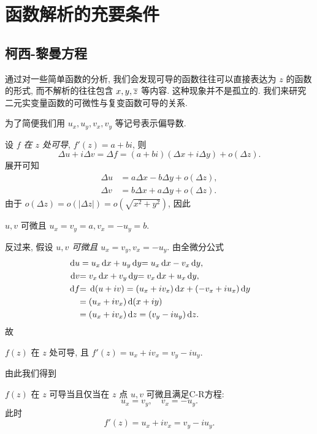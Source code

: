 \documentclass[nocolor,theme=doremi,lang=cn,11pt,chinese,twoside,openright,usesamecnt]{elegantbook}
\makeatletter
\newenvironment{block@}{\begin{tcolorbox}[blockstyle,notitle]}{\end{tcolorbox}}
\newenvironment{alertblock}[1]{\begin{tcolorbox}[alertstyle,title=#1]}{\end{tcolorbox}}
\makeatother
\begin{document}
\section{函数解析的充要条件}

\subsection{柯西-黎曼方程}

通过对一些简单函数的分析, 我们会发现可导的函数往往可以直接表达为 $z$ 的函数的形式, 而不解析的往往包含 $x,y,\overline z$ 等内容.
这种现象并不是孤立的.
我们来研究二元实变量函数的可微性与复变函数可导的关系.

为了简便我们用 $u_x,u_y,v_x,v_y$ 等记号表示偏导数.

设 \emph{$f$ 在 $z$ 处可导}, $f'(z)=a+bi$,
则
\[\Delta u+i\Delta v=\Delta f=(a+bi)(\Delta x+i\Delta y)+o(\Delta z).\]
展开可知
\begin{align*}
	\Delta u&=a\Delta x-b\Delta y+o(\Delta z),\\
	\Delta v&=b\Delta x+a\Delta y+o(\Delta z).
\end{align*}
由于 $o(\Delta z)=o(|\Delta z|)=o(\sqrt{x^2+y^2})$,
因此 
\begin{block@}
	\begin{center}
		$u,v$ 可微且 $u_x=v_y=a,v_x=-u_y=b$.
	\end{center}
\end{block@}

反过来, 假设 \emph{$u,v$ 可微且 $u_x=v_y, v_x=-u_y$}.
由全微分公式
\begin{align*}
	\,\mathrm{d} u&=u_x\,\mathrm{d} x+u_y\,\mathrm{d} y
	{=u_x\,\mathrm{d} x-v_x\,\mathrm{d} y,}\\
	{\,\mathrm{d} v}&{=v_x\,\mathrm{d} x+v_y\,\mathrm{d} y}{=v_x\,\mathrm{d} x+u_x\,\mathrm{d} y,}\\
	{\,\mathrm{d} f}&
	{=\,\mathrm{d} (u+iv)=(u_x+i v_x)\,\mathrm{d} x+(-v_x+i u_x)\,\mathrm{d} y}\\
	&{=(u_x+i v_x)\,\mathrm{d}(x+iy)}\\
	&{=(u_x+i v_x)\,\mathrm{d} z=(v_y-i u_y)\,\mathrm{d} z.}
\end{align*}
故
\begin{block@}
	\begin{center}
		$f(z)$ 在 $z$ 处可导, 且 $f'(z)=u_x+i v_x=v_y-i u_y$.
	\end{center}
\end{block@}

由此我们得到
\begin{alertblock}{柯西-黎曼方程 (C-R方程)}
	$f(z)$ 在 $z$ 可导当且仅当在 $z$ 点 $u,v$ 可微且满足C-R方程:
	\[u_x=v_y,\quad v_x=-u_y.\]
	此时
	\[f'(z)=u_x+iv_x=v_y-iu_y.\]
\end{alertblock}
\end{document}
